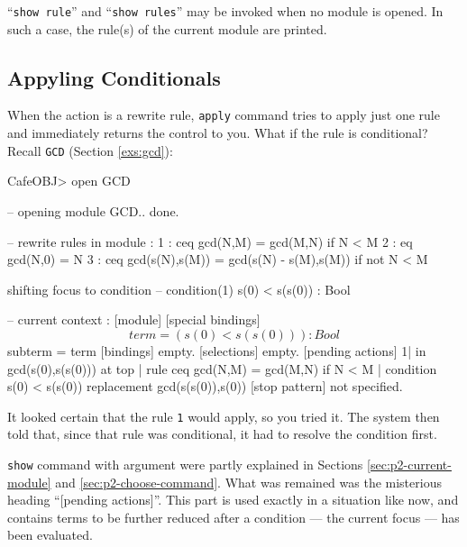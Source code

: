 \documentclass[a4paper]{memoir}
\begin{document}
``\verb|show rule|'' and ``\verb|show rules|'' may be invoked when no module
is opened. In such a case, the rule(s) of the current module are printed.
\subsection{Appyling Conditionals}\label{sec:p2-apply-to-cond}

When the action is a rewrite rule, \verb|apply| command tries to
apply just one rule and immediately returns the control to you.
What if the rule is conditional? Recall \verb|GCD| (Section
\ref{exs:gcd}):
\begin{vvtm}
\begin{ccode}
  CafeOBJ> open GCD

  -- opening module GCD.. done.


   -- rewrite rules in module : %
    1 : ceq gcd(N,M) = gcd(M,N) if N < M
    2 : eq gcd(N,0) = N
    3 : ceq gcd(s(N),s(M)) = gcd(s(N) - s(M),s(M)) if not N < M

  shifting focus to condition
  -- condition(1) s(0) < s(s(0)) : Bool

  -- current context :
  [module] %
  [special bindings]
    $$term    = (s(0) < s(s(0))) : Bool
    $$subterm =  $$term
  [bindings] empty.
  [selections]  empty.
  [pending actions] 
    1| in gcd(s(0),s(s(0)))  at top
     | rule ceq gcd(N,M) = gcd(M,N) if N < M
     | condition s(0) < s(s(0))  replacement gcd(s(s(0)),s(0))
  [stop pattern] not specified.

\end{ccode}
\end{vvtm}
It looked certain that the rule \verb|1| would apply, so you tried it.
The system then told that, since that rule was conditional, it had to
resolve the condition first.

\verb|show| command with  argument were
partly explained in Sections \ref{sec:p2-current-module} and
\ref{sec:p2-choose-command}. What was remained was the misterious
heading ``[pending actions]''. This part is used exactly in
a situation like now, and contains terms to be further
reduced after a condition --- the current focus --- has been evaluated.
\end{document}
